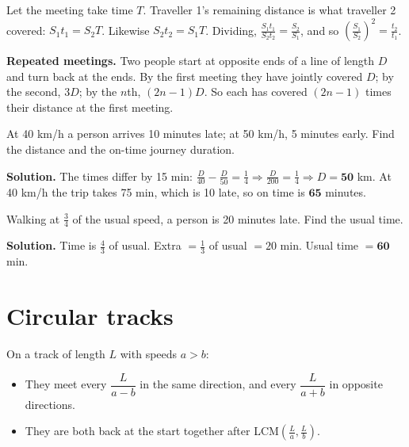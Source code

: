 \documentclass[11pt,a4paper,openany]{report}
\begin{document}
\begin{why}
Let the meeting take time $T$. Traveller 1's remaining distance is what traveller 2 covered: $S_1t_1=S_2T$. Likewise $S_2t_2=S_1T$. Dividing, $\frac{S_1t_1}{S_2t_2}=\frac{S_2}{S_1}$, and so $\left(\frac{S_1}{S_2}\right)^2=\frac{t_2}{t_1}$.
\end{why}

\textbf{Repeated meetings.} Two people start at opposite ends of a line of length $D$ and turn back at the ends. By the first meeting they have jointly covered $D$; by the second, $3D$; by the $n$th, $(2n-1)D$. So each has covered $(2n-1)$ times their distance at the first meeting.

\begin{example}
At 40 km/h a person arrives 10 minutes late; at 50 km/h, 5 minutes early. Find the distance and the on-time journey duration.

\textbf{Solution.} The times differ by 15 min: $\frac D{40}-\frac D{50}=\frac14\Rightarrow\frac D{200}=\frac14\Rightarrow D=\mathbf{50}$ km. At 40 km/h the trip takes 75 min, which is 10 late, so on time is $\mathbf{65}$ minutes.
\end{example}

\begin{example}
Walking at $\frac34$ of the usual speed, a person is 20 minutes late. Find the usual time.

\textbf{Solution.} Time is $\frac43$ of usual. Extra $=\frac13$ of usual $=20$ min. Usual time $=\mathbf{60}$ min.
\end{example}

\section{Circular tracks}
On a track of length $L$ with speeds $a>b$:
\begin{itemize}[nosep]
\item They meet every $\dfrac{L}{a-b}$ in the same direction, and every $\dfrac{L}{a+b}$ in opposite directions.
\item They are both back at the start together after LCM$\left(\frac La,\frac Lb\right)$.
\end{itemize}
\end{document}
